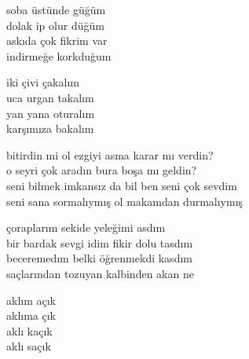 \documentclass[10pt, openright, oneside]{memoir}
\theoremstyle{definition}
\begin{document}
\vspace*{\fill}
%
\newpage
{}
\vspace*{\fill}
\settowidth{\versewidth}{askıda çok fikrim var}
\begin{cverse}
  soba üstünde güğüm \\
  dolak ip olur düğüm \\
  askıda çok fikrim var \\
  indirmeğe korkduğum

  iki çivi çakalım \\
  uca urgan takalım \\
  yan yana oturalım \\
  karşımıza bakalım \\
\end{cverse}
\vspace*{\fill}
%
\newpage
{}
\vspace*{\fill}
\settowidth{\versewidth}{seni bilmek imkansız da bil ben seni çok sevdim}
\begin{cverse}
  bitirdin mi ol ezgiyi asma karar mı verdin? \\
  o seyri çok aradın bura boşa mı geldin? \\
  seni bilmek imkansız da bil ben seni çok sevdim \\
  seni sana sormalıymış ol makamdan durmalıymış \\
\end{cverse}
\vspace*{\fill}
%
\newpage
{}
\vspace*{\fill}
\settowidth{\versewidth}{bir bardak sevgi idim fikir dolu tasdım}
\begin{cverse}
  çoraplarım sekide yeleğimi asdım \\
  bir bardak sevgi idim fikir dolu tasdım \\
  beceremedım belki öğrenmekdi kasdım \\
  saçlarından tozuyan kalbinden akan ne \\
\end{cverse}
\vspace*{\fill}
%
\newpage
{}
\vspace*{\fill}
\settowidth{\versewidth}{aklım açık}
\begin{cverse}
  aklım açık \\
  aklıma çık \\
  aklı kaçık \\
  aklı saçık \\
\end{cverse}
\end{document}

